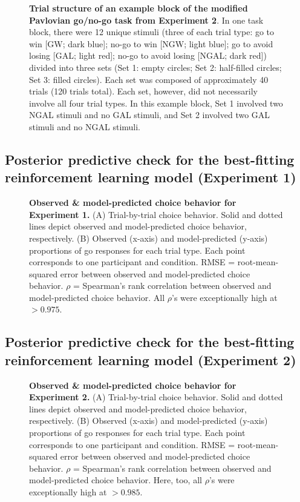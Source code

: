 \documentclass[a4paper,12pt]{article}
\begin{document}
\begin{refsection}[supp]
\begin{figure}[h]
    \centerline{}
    \caption{{\bf Trial structure of an example block of the modified Pavlovian go/no-go task from Experiment 2}. In one task block, there were 12 unique stimuli (three of each trial type: go to win [GW; dark blue]; no-go to win [NGW; light blue]; go to avoid losing [GAL; light red]; no-go to avoid losing [NGAL; dark red]) divided into three sets (Set 1: empty circles; Set 2: half-filled circles; Set 3: filled circles). Each set was composed of approximately 40 trials (120 trials total). Each set, however, did not necessarily involve all four trial types. In this example block, Set 1 involved two NGAL stimuli and no GAL stimuli, and Set 2 involved two GAL stimuli and no NGAL stimuli.}
    \label{fig:figS01}
\end{figure}

\break
\subsection*{Posterior predictive check for the best-fitting reinforcement learning model (Experiment 1)}

\begin{figure}[h]
    \centerline{}
    \caption{{\bf Observed \& model-predicted choice behavior for Experiment 1.} (A) Trial-by-trial choice behavior. Solid and dotted lines depict observed and model-predicted choice behavior, respectively. (B) Observed (x-axis) and model-predicted (y-axis) proportions of go responses for each trial type. Each point corresponds to one participant and condition. RMSE = root-mean-squared error between observed and model-predicted choice behavior. $\rho$ = Spearman's rank correlation between observed and model-predicted choice behavior. All $\rho$'s were exceptionally high at $>0.975$.}
    \label{fig:exp1_ppc}
\end{figure}

\clearpage
\subsection*{Posterior predictive check for the best-fitting reinforcement learning model (Experiment 2)}

\begin{figure}[h]
    \centerline{}
     \caption{{\bf Observed \& model-predicted choice behavior for Experiment 2.} (A) Trial-by-trial choice behavior. Solid and dotted lines depict observed and model-predicted choice behavior, respectively. (B) Observed (x-axis) and model-predicted (y-axis) proportions of go responses for each trial type. Each point corresponds to one participant and condition. RMSE = root-mean-squared error between observed and model-predicted choice behavior. $\rho$ = Spearman's rank correlation between observed and model-predicted choice behavior. Here, too, all $\rho$'s were exceptionally high at $>0.985$.}
    \label{fig:exp2_ppc}
\end{figure}


\end{refsection}
\end{document}
